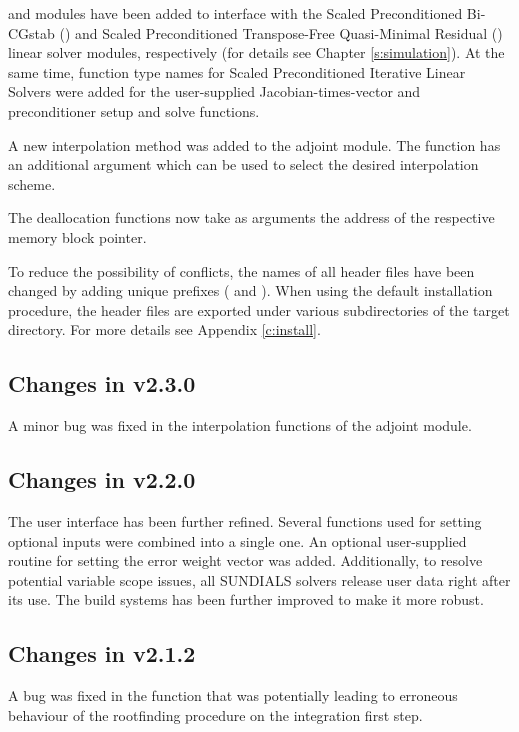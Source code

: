 {\cvspbcg} and {\cvsptfqmr} modules have been added to interface with the
Scaled Preconditioned Bi-CGstab ({\spbcg}) and Scaled Preconditioned
Transpose-Free Quasi-Minimal Residual ({\sptfqmr}) linear solver modules,
respectively (for details see Chapter \ref{s:simulation}).
At the same time, function type names for Scaled Preconditioned Iterative
Linear Solvers were added for the user-supplied Jacobian-times-vector and
preconditioner setup and solve functions.

A new interpolation method was added to the {\cvodes} adjoint module. The
function  has an additional argument which can be used to select
the desired interpolation scheme.

The deallocation functions now take as arguments the address of the respective 
memory block pointer.

To reduce the possibility of conflicts, the names of all header files have
been changed by adding unique prefixes ( and ).
When using the default installation procedure, the header files are exported
under various subdirectories of the target  directory. For more
details see Appendix \ref{c:install}.

\subsection*{Changes in v2.3.0}

A minor bug was fixed in the interpolation functions of the adjoint
{\cvodes} module.

\subsection*{Changes in v2.2.0}

The user interface has been further refined. Several functions used
for setting optional inputs were combined into a single one.  An
optional user-supplied routine for setting the error weight vector was
added.  Additionally, to resolve potential variable scope issues, all
SUNDIALS solvers release user data right after its use. The build
systems has been further improved to make it more robust.

\subsection*{Changes in v2.1.2}

A bug was fixed in the  function that was potentially
leading to erroneous behaviour of the rootfinding procedure on the 
integration first step.

